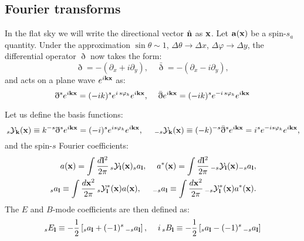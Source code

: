 \documentclass[a4paper,10pt]{article}
\newcommand{\nv}{\hat{\bf n}}
\begin{document}
  \subsection{Fourier transforms}
    In the flat sky we will write the directional vector $\nv$ as ${\bf x}$. Let ${\bf a}({\bf x})$ be a spin-$s_a$ quantity. Under the approximation $\sin\theta\sim1$, $\Delta\theta\rightarrow \Delta x$, $\Delta\varphi\rightarrow\Delta y$, the differential operator $\eth$ now takes the form:
    \begin{equation}
      \eth=-(\partial_x+i\partial_y),\hspace{12pt}\bar{\eth}=-(\partial_x-i\partial_y),
    \end{equation}
    and acts on a plane wave $e^{i{\bf k}{\bf x}}$ as:
    \begin{equation}
      \eth^s e^{i{\bf k}{\bf x}}=(-ik)^se^{i\,s\varphi_k}e^{i{\bf k}{\bf x}},\hspace{12pt}
      \bar{\eth}e^{i{\bf k}{\bf x}}=(-ik)^se^{-i\,s\varphi_k}e^{i{\bf k}{\bf x}}
    \end{equation}

    Let us define the basis functions:
    \begin{equation}
      \,_s{\cal Y}_{\bf k}({\bf x})\equiv k^{-s}\eth^se^{i{\bf k}{\bf x}}=(-i)^se^{is\varphi_k}e^{i{\bf k}{\bf x}},\hspace{12pt}\,
      _{-s}{\cal Y}_{\bf k}({\bf x})\equiv (-k)^{-s}\bar{\eth}^se^{i{\bf k}{\bf x}}=i^se^{-is\varphi_k}e^{i{\bf k}{\bf x}},
    \end{equation}
    and the spin-$s$ Fourier coefficients:
    \begin{align}
      a({\bf x})  =\int\frac{d{\bf l}^2}{2\pi}\,_s{\cal Y}_{\bf l}({\bf x})_sa_{\bf l},\hspace{12pt}
      a^*({\bf x})=\int\frac{d{\bf l}^2}{2\pi}\,_{-s}{\cal Y}_{\bf l}({\bf x})_{-s}a_{\bf l},\\
      \,_sa_{\bf l}\equiv\int\frac{d{\bf x}^2}{2\pi}\,_s{\cal Y}^*_{\bf l}({\bf x})a({\bf x}),\hspace{12pt}
      \,_{-s}a_{\bf l}\equiv\int\frac{d{\bf x}^2}{2\pi}\,_{-s}{\cal Y}^*_{\bf l}({\bf x})a^*({\bf x}).
    \end{align}
    The $E$ and $B$-mode coefficients are then defined as:
    \begin{align}
      _sE_{\bf l}\equiv-\frac{1}{2}\left[_sa_{\bf l}+(-1)^s\,_{-s}a_{\bf l}\right],\hspace{12pt}
      i\,_sB_{\bf l}\equiv-\frac{1}{2}\left[_sa_{\bf l}-(-1)^s\,_{-s}a_{\bf l}\right]
    \end{align}
    
\end{document}
